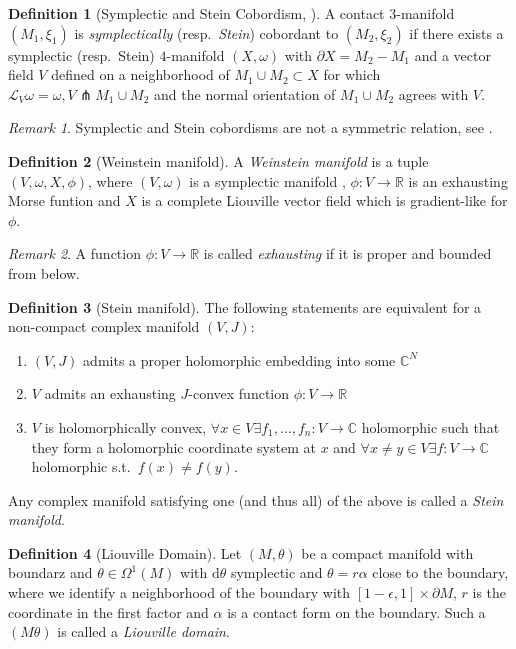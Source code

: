 \documentclass[a4paper]{article}
\newcommand{\RR}{\mathbb{R}}
\newcommand{\CC}{\mathbb{C}}
\newcommand{\mcL}{\mathcal L}
\newcommand{\dd}{\mathrm{d}}
\newcommand{\del}{\partial}
\newcommand{\lra}{\longrightarrow}
\theoremstyle{definition}
\theoremstyle{definition}
\newtheorem{definition}{Definition}
\theoremstyle{remark}
\newtheorem{rmk}{Remark}
\theoremstyle{remark}
\theoremstyle{remark}
\begin{document}
\begin{definition}[Symplectic and Stein Cobordism, \cite{Etnyre2002}]
  A contact $3$-manifold $(M_1,\xi_1)$ is \emph{symplectically} (resp.\ \emph{Stein}) cobordant to $(M_2,\xi_2)$ if there exists a symplectic (resp.\ Stein) $4$-manifold $(X,\omega)$ with $\del X=M_2-M_1$ and a vector field $V$ defined on a neighborhood of $M_1\cup M_2\subset X$ for which $\mcL_V\omega=\omega, V\pitchfork M_1\cup M_2$ and the normal orientation of $M_1\cup M_2$ agrees with $V$.
\end{definition}

\begin{rmk}
Symplectic and Stein cobordisms are not a symmetric relation, see \cite{Etnyre2002}.
\end{rmk}

\begin{definition}[Weinstein manifold]
A \emph{Weinstein manifold} is a tuple $(V,\omega,X,\phi)$, where $(V,\omega)$ is a symplectic manifold , $\phi:V\lra\RR$ is an exhausting Morse funtion and $X$ is a complete Liouville vector field which is gradient-like for $\phi$.
\end{definition}

\begin{rmk}
  A function $\phi:V\lra\RR$ is called \emph{exhausting} if it is proper and bounded from below.
\end{rmk}

\begin{definition}[Stein manifold]
  The following statements are equivalent for a non-compact complex manifold $(V,J)$:
  \begin{enumerate}
    \item $(V,J)$ admits a proper holomorphic embedding into some $\CC^N$
    \item $V$ admits an exhausting $J$-convex function $\phi:V\lra\RR$
    \item $V$ is holomorphically convex, $\forall x\in V\exists f_1,\ldots,f_n:V\lra\CC$ holomorphic such that they form a holomorphic coordinate system at $x$ and $\forall x\neq y\in V\exists f:V\lra\CC$ holomorphic s.t.\ $f(x)\neq f(y)$.
  \end{enumerate}
  Any complex manifold satisfying one (and thus all) of the above is called a \emph{Stein manifold}.
\end{definition}

\begin{definition}[Liouville Domain]
  Let $(M,\theta)$ be a compact manifold with boundarz and $\theta\in\Omega^1(M)$ with $\dd\theta$ symplectic and $\theta=r\alpha$ close to the boundary, where we identify a neighborhood of the boundary with $[1-\epsilon,1]\times\del M$, $r$ is the coordinate in the first factor and $\alpha$ is a contact form on the boundary. Such a $(M\theta)$ is called a \emph{Liouville domain}.
\end{definition}
\end{document}
